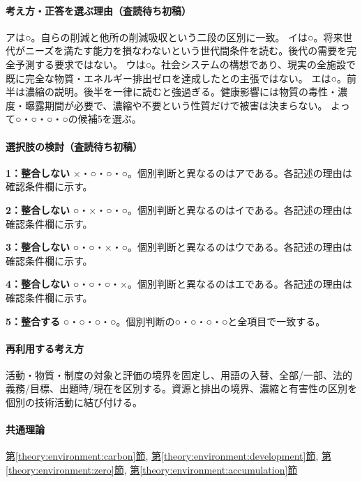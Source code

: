 \paragraph{考え方・正答を選ぶ理由（査読待ち初稿）} アは○。自らの削減と他所の削減吸収という二段の区別に一致。 イは○。将来世代がニーズを満たす能力を損なわないという世代間条件を読む。後代の需要を完全予測する要求ではない。 ウは○。社会システムの構想であり、現実の全施設で既に完全な物質・エネルギー排出ゼロを達成したとの主張ではない。 エは○。前半は濃縮の説明。後半を一律に読むと強過ぎる。健康影響には物質の毒性・濃度・曝露期間が必要で、濃縮や不要という性質だけで被害は決まらない。 よって○・○・○・○の候補5を選ぶ。

\paragraph{選択肢の検討（査読待ち初稿）}\mbox{}\par

\noindent\textbf{1：整合しない} ×・○・○・○。個別判断と異なるのはアである。各記述の理由は確認条件欄に示す。\par

\noindent\textbf{2：整合しない} ○・×・○・○。個別判断と異なるのはイである。各記述の理由は確認条件欄に示す。\par

\noindent\textbf{3：整合しない} ○・○・×・○。個別判断と異なるのはウである。各記述の理由は確認条件欄に示す。\par

\noindent\textbf{4：整合しない} ○・○・○・×。個別判断と異なるのはエである。各記述の理由は確認条件欄に示す。\par

\noindent\textbf{5：整合する} ○・○・○・○。個別判断の○・○・○・○と全項目で一致する。\par

\paragraph{再利用する考え方} 活動・物質・制度の対象と評価の境界を固定し、用語の入替、全部/一部、法的義務/目標、出題時/現在を区別する。資源と排出の境界、濃縮と有害性の区別を個別の技術活動に結び付ける。

\paragraph{共通理論} \hyperref[theory:environment:carbon]{第\ref*{theory:environment:carbon}節}, \hyperref[theory:environment:development]{第\ref*{theory:environment:development}節}, \hyperref[theory:environment:zero]{第\ref*{theory:environment:zero}節}, \hyperref[theory:environment:accumulation]{第\ref*{theory:environment:accumulation}節}

